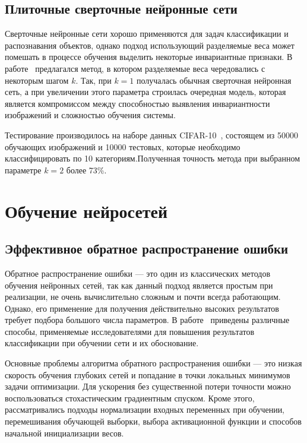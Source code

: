 \documentclass[a4paper,14pt]{extarticle} %
\begin{document}
\subsection{Плиточные сверточные нейронные сети}
\hspace{\parindent} Сверточные нейронные сети хорошо применяются для задач классификации и распознавания объектов, однако подход использующий разделяемые веса может помешать в процессе обучения выделить некоторые инвариантные признаки. В работе~\cite{ngiam2010tiled} предлагался метод, в котором разделяемые веса чередовались с некоторым шагом $k$. Так, при $k=1$ получалась обычная сверточная нейронная сеть, а при увеличении этого параметра строилась очередная модель, которая является компромиссом между способностью выявления инвариантности изображений и сложностью обучения системы.

Тестирование производилось на наборе данных CIFAR-10~\cite{krizhevsky2009learning}, состоящем из 50000 обучающих изображений и 10000 тестовых, которые необходимо классифицировать по 10 категориям.Полученная точность метода при выбранном параметре $k=2$ более 73\%.

\section{Обучение нейросетей}

\subsection{Эффективное обратное распространение ошибки}
\hspace{\parindent} Обратное распространение ошибки --- это один из классических методов обучения нейронных сетей, так как данный подход является простым при реализации, не очень вычислительно сложным и почти всегда работающим. Однако, его применение для получения действительно высоких результатов требует подбора большого числа параметров. В работе~\cite{lecun2012efficient} приведены различные способы, применяемые исследователями для повышения результатов классификации при обучении сети и их обоснование.

Основные проблемы алгоритма обратного распространения ошибки --- это низкая скорость обучения глубоких сетей и попадание в точки локальных минимумов задачи оптимизации. Для ускорения без существенной потери точности можно воспользоваться стохастическим градиентным спуском. Кроме этого, рассматривались подходы нормализации входных переменных при обучении, перемешивания обучающей выборки, выбора активационной функции и способов начальной инициализации весов.
\end{document}
